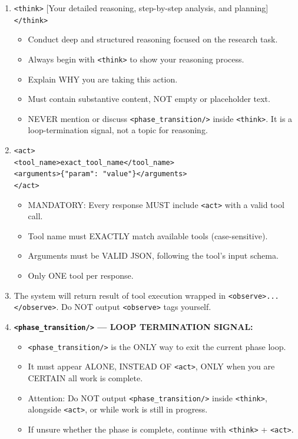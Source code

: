 \begin{tcolorbox}
\begin{enumerate}[nosep,leftmargin=12pt]
	\item \texttt{<think>} [Your detailed reasoning, step-by-step analysis, and planning] \texttt{</think>}
	\begin{itemize}[nosep,leftmargin=16pt]
		\item Conduct deep and structured reasoning focused on the research task.
		\item Always begin with \texttt{<think>} to show your reasoning process.
		\item Explain WHY you are taking this action.
		\item Must contain substantive content, NOT empty or placeholder text.
		\item NEVER mention or discuss \texttt{<phase\_transition/>} inside \texttt{<think>}. It is a loop-termination signal, not a topic for reasoning.
	\end{itemize}
	\item \texttt{<act>}\\[2pt]
	\qquad \texttt{<tool\_name>exact\_tool\_name</tool\_name>}\\
	\qquad \texttt{<arguments>\{"param": "value"\}</arguments>}\\[2pt]
	\texttt{</act>}
	\begin{itemize}[nosep,leftmargin=16pt]
		\item MANDATORY: Every response MUST include \texttt{<act>} with a valid tool call.
		\item Tool name must EXACTLY match available tools (case-sensitive).
		\item Arguments must be VALID JSON, following the tool's input schema.
		\item Only ONE tool per response.
	\end{itemize}
	\item The system will return result of tool execution wrapped in \texttt{<observe>...</observe>}. Do NOT output \texttt{<observe>} tags yourself.
	\item \textbf{\texttt{<phase\_transition/>} --- LOOP TERMINATION SIGNAL:}
	\begin{itemize}[nosep,leftmargin=16pt]
		\item \texttt{<phase\_transition/>} is the ONLY way to exit the current phase loop.
		\item It must appear ALONE, INSTEAD OF \texttt{<act>}, ONLY when you are CERTAIN all work is complete.
		\item Attention: Do NOT output \texttt{<phase\_transition/>} inside \texttt{<think>}, alongside \texttt{<act>}, or while work is still in progress.
		\item If unsure whether the phase is complete, continue with \texttt{<think>} + \texttt{<act>}.
	\end{itemize}
\end{enumerate}


\end{tcolorbox}
